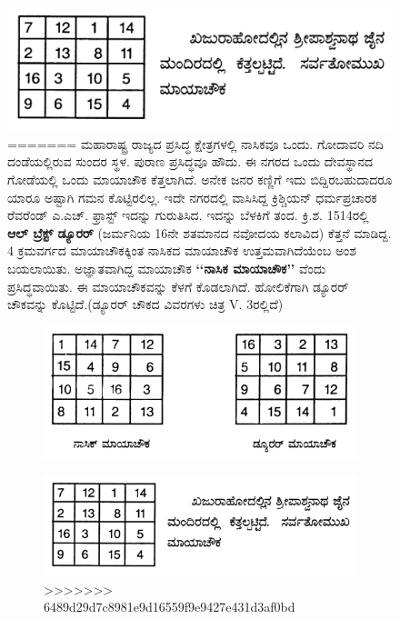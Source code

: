 \begin{figure}[H]
\includegraphics[scale=.9]{src/figures/chap4/fig4-2.jpg}
=======
ಮಹಾರಾಷ್ಟ್ರ ರಾಜ್ಯದ ಪ್ರಸಿದ್ಧ ಕ್ಷೇತ್ರಗಳಲ್ಲಿ ನಾಸಿಕವೂ ಒಂದು. ಗೋದಾವರಿ ನದಿ ದಂಡೆ\-ಯಲ್ಲಿರುವ ಸುಂದರ ಸ್ಥಳ. ಪುರಾಣ ಪ್ರಸಿದ್ಧವೂ ಹೌದು. ಈ ನಗರದ ಒಂದು ದೇವಸ್ಥಾನದ ಗೋಡೆಯಲ್ಲಿ ಒಂದು ಮಾಯಾಚೌಕ ಕೆತ್ತಲಾಗಿದೆ. ಅನೇಕ ಜನರ ಕಣ್ಣಿಗೆ ಇದು ಬಿದ್ದಿರಬಹುದಾದರೂ ಯಾರೂ ಅಷ್ಟಾಗಿ ಗಮನ ಕೊಟ್ಟಿರಲಿಲ್ಲ. ಇದೇ ನಗರದಲ್ಲಿ ವಾಸಿಸಿದ್ದ ಕ್ರಿಶ್ಚಿಯನ್ ಧರ್ಮಪ್ರಚಾರಕ ರೆವರೆಂಡ್ ಎ.ಎಚ್. ಫ್ರಾಸ್ಟ್ ಇದನ್ನು ಗುರುತಿಸಿದ. ಇದನ್ನು ಬೆಳಕಿಗೆ ತಂದ. ಕ್ರಿ.ಶ. 1514ರಲ್ಲಿ \textbf{ಆಲ್ ಬ್ರೆಕ್ಟ್ ಡ್ಯೂರರ್} (ಜರ್ಮನಿಯ 16ನೇ ಶತಮಾನದ ನವೋದಯ ಕಲಾವಿದ) ಕೆತ್ತನೆ ಮಾಡಿದ್ದ. 4 ಕ್ರಮವರ್ಗದ ಮಾಯಾಚೌಕಕ್ಕಿಂತ ನಾಸಿಕದ ಮಾಯಾಚೌಕ ಉತ್ತಮವಾಗಿದೆಯೆಂಬ ಅಂಶ ಬಯಲಾಯಿತು. ಅಜ್ಞಾತವಾಗಿದ್ದ ಮಾಯಾಚೌಕ \textbf{‘‘ನಾಸಿಕ ಮಾಯಾಚೌಕ’’} ವೆಂದು ಪ್ರಸಿದ್ಧವಾಯಿತು. ಈ ಮಾಯಾಚೌಕವನ್ನು ಕೆಳಗೆ ಕೊಡಲಾಗಿದೆ. ಹೋಲಿಕೆಗಾಗಿ ಡ್ಯೂರರ್ ಚೌಕವನ್ನು ಕೊಟ್ಟಿದೆ.(ಡ್ಯೂರರ್ ಚೌಕದ ವಿವರಗಳು ಚಿತ್ರ V. 3\break ರಲ್ಲಿದೆ)
\begin{figure}[H]
\includegraphics[scale=.8]{src/figures/chap4/fig4.1.jpg}
\end{figure}
\begin{figure}[H]
\includegraphics[scale=.8]{src/figures/chap4/fig4.2.jpg}
>>>>>>> 6489d29d7c8981e9d16559f9e9427e431d3af0bd
\end{figure}


\end{figure}
